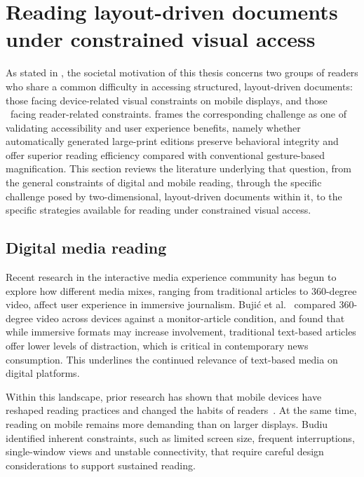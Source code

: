 
\section{Reading layout-driven documents under constrained visual access}
\label{sec:sota-reading}

As stated in , the societal motivation of this thesis concerns two groups of readers who share a common difficulty in accessing structured, layout-driven documents: those facing device-related visual constraints on mobile displays, and those \LV\ facing reader-related constraints.  frames the corresponding challenge as one of validating accessibility and user experience benefits, namely whether automatically generated large-print editions preserve behavioral integrity and offer superior reading efficiency compared with conventional gesture-based magnification. This section reviews the literature underlying that question, from the general constraints of digital and mobile reading, through the specific challenge posed by two-dimensional, layout-driven documents within it, to the specific strategies available for reading under constrained visual access.

\subsection{Digital media reading}
\label{sec:sota-digital-reading}

Recent research in the interactive media experience community has begun to explore how different media mixes, ranging from traditional articles to 360-degree video, affect user experience in immersive journalism. Bujić et al.~\cite{bujic-imx2023} compared 360-degree video across devices against a monitor-article condition, and found that while immersive formats may increase involvement, traditional text-based articles offer lower levels of distraction, which is critical in contemporary news consumption. This underlines the continued relevance of text-based media on digital platforms.

Within this landscape, prior research has shown that mobile devices have reshaped reading practices and changed the habits of readers~\cite{readinghabits2016, reading-periodicals2021, mobilereading2015}. At the same time, reading on mobile remains more demanding than on larger displays. Budiu~\cite{Budiu2015} identified inherent constraints, such as limited screen size, frequent interruptions, single-window views and unstable connectivity, that require careful design considerations to support sustained reading.


